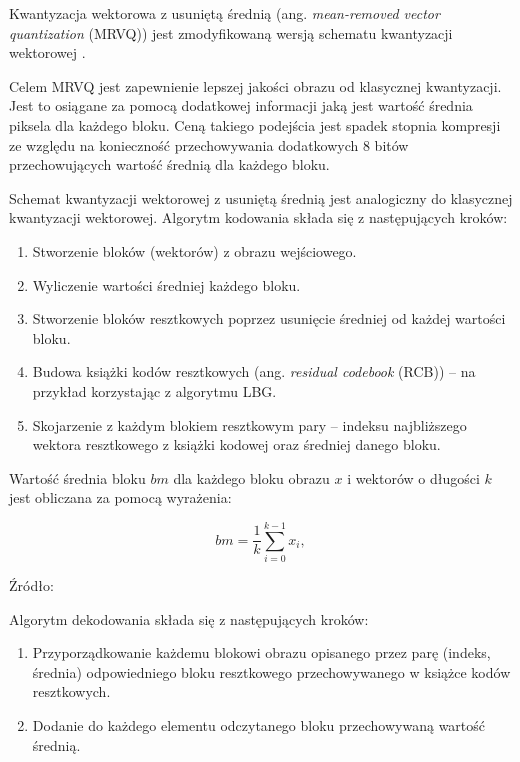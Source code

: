 \documentclass{article}
\begin{document}
Kwantyzacja wektorowa z usuniętą średnią (ang. \emph{mean-removed vector quantization} (MRVQ)) jest zmodyfikowaną wersją schematu kwantyzacji wektorowej \cite{meanremovedVQ}.

Celem MRVQ jest zapewnienie lepszej jakości obrazu od klasycznej kwantyzacji. Jest to osiągane za pomocą dodatkowej informacji jaką jest wartość średnia piksela dla każdego bloku. Ceną takiego podejścia jest spadek stopnia kompresji ze względu na konieczność przechowywania dodatkowych 8 bitów przechowujących wartość średnią dla każdego bloku.

Schemat kwantyzacji wektorowej z usuniętą średnią jest analogiczny do klasycznej kwantyzacji wektorowej. Algorytm kodowania składa się z następujących kroków:

\begin{enumerate}
\item Stworzenie bloków (wektorów) z obrazu wejściowego.
\item Wyliczenie wartości średniej każdego bloku.
\item Stworzenie bloków resztkowych poprzez usunięcie średniej od każdej wartości bloku.
\item Budowa książki kodów resztkowych (ang. \emph{residual codebook} (RCB)) -- na przykład korzystając z algorytmu LBG.
\item Skojarzenie z każdym blokiem resztkowym pary -- indeksu najbliższego wektora resztkowego z książki kodowej oraz średniej danego bloku.
\end{enumerate}

Wartość średnia bloku $bm$ dla każdego bloku obrazu $x$ i wektorów o długości $k$ jest obliczana za pomocą wyrażenia: 

\begin{equation}
bm = \frac{1}{k} \sum_{i=0}^{k-1} x_{i},
\end{equation} 

Źródło: \cite{meanremovedVQ}

Algorytm dekodowania składa się z następujących kroków:

\begin{enumerate}
\item Przyporządkowanie każdemu blokowi obrazu opisanego przez parę (indeks, średnia) odpowiedniego bloku resztkowego przechowywanego w książce kodów resztkowych.
\item Dodanie do każdego elementu odczytanego bloku przechowywaną wartość średnią.
\end{enumerate}
\end{document}

